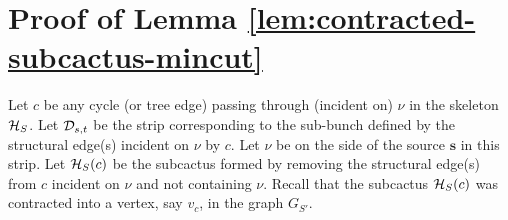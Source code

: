 \section{Proof of Lemma \ref{lem:contracted-subcactus-mincut}} \label{appendix:contracted-subcactus-mincut}

Let $c$ be any cycle (or tree edge) passing through (incident on) $\nu$ in the skeleton
${\cal H}_S$. Let ${\cal D}_{s,t}$ be the strip corresponding to the sub-bunch defined by the structural edge(s) incident on $\nu$ by $c$.
Let $\nu$ be on the side of the source $\mathbf{s}$ in this strip.
Let ${\cal H}_S(c)$ be the subcactus formed by removing the structural edge(s) from $c$ incident on $\nu$ and not containing $\nu$. 
Recall that the subcactus ${\cal H}_S(c)$ was contracted into a vertex, say $v_c$, in the graph 
$G_{S'}$.


